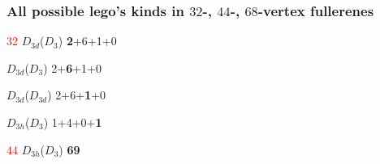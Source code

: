 \documentclass{beamer}
\begin{document}
\begin{frame}\frametitle{All possible lego's kinds  in $32$-, $44$-, $68$-vertex fullerenes}
\vspace{-5mm}

\begin{center}
\begin{minipage}[b]{2.0cm}
\centering
{}\par
\textcolor{red}{32}
$D_{3d}$($D_3$) {\bf 2}+6+1+0
\end{minipage}
\begin{minipage}[b]{1.9cm}
\centering
{}\par
$D_{3d}$($D_3$) 2+{\bf 6}+1+0
\end{minipage}
\begin{minipage}[b]{1.9cm}
\centering
{}\par
$D_{3d}$($D_{3d}$) 2+6+{\bf 1}+0
\end{minipage}
\begin{minipage}[b]{1.9cm}
\centering
{}\par
$D_{3h}$($D_{3}$) 1+4+0+{\bf 1}
\end{minipage}


\begin{minipage}[b]{2.1cm}
\centering
{}\par
\textcolor{red}{44}
$D_{3h}$($D_3$) {\bf 69}
\end{minipage}
\vspace{-1mm}



\end{center}
\end{frame}
\end{document}
